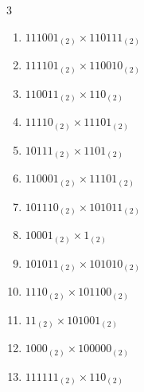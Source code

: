 \begin{multicols}{3}
\begin{enumerate}
  \item $111001_{(2)} \times 110111_{(2)}$


  \item $111101_{(2)} \times 110010_{(2)}$


  \item $110011_{(2)} \times 110_{(2)}$


\columnbreak %

  \item $11110_{(2)} \times 11101_{(2)}$


  \item $10111_{(2)} \times 1101_{(2)}$


  \item $110001_{(2)} \times 11101_{(2)}$


  \item $101110_{(2)} \times 101011_{(2)}$


  \item $10001_{(2)} \times 1_{(2)}$


\columnbreak %

  \item $101011_{(2)} \times 101010_{(2)}$


  \item $1110_{(2)} \times 101100_{(2)}$


  \item $11_{(2)} \times 101001_{(2)}$


  \item $1000_{(2)} \times 100000_{(2)}$


  \item $111111_{(2)} \times 110_{(2)}$


\end{enumerate}
\end{multicols}
